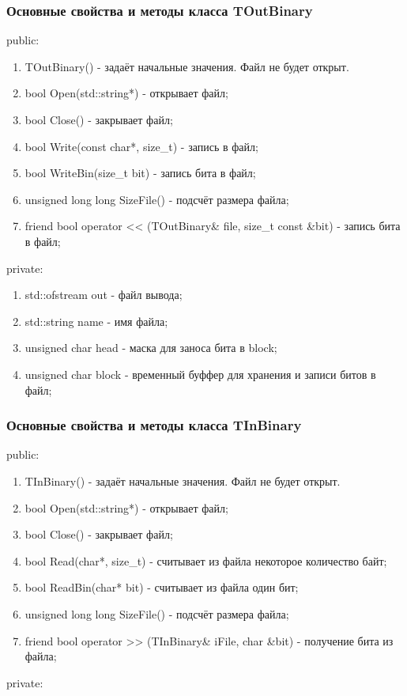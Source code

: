 \documentclass[12pt]{article}
\begin{document}
\subsubsection*{Основные свойства и методы класса TOutBinary}
\noindent
public:

\begin{enumerate}
	\item TOutBinary() - задаёт начальные значения. Файл не будет открыт.
	\item bool Open(std::string*) - открывает файл;
	\item bool Close() - закрывает файл;
	\item bool Write(const char*, size\_t) - запись в файл;
	\item bool WriteBin(size\_t bit) - запись бита в файл;
	\item unsigned long long SizeFile() - подсчёт размера файла;
	\item friend bool operator << (TOutBinary\& file, size\_t const \&bit) - запись бита в файл;
\end{enumerate}
\noindent
private:

\begin{enumerate}
	\item std::ofstream out - файл вывода;
    \item std::string name - имя файла;
    \item unsigned char head - маска для заноса бита в block;
    \item unsigned char block - временный буффер для хранения и записи битов в файл;
\end{enumerate}

\subsubsection*{Основные свойства и методы класса TInBinary}
\noindent
public:

\begin{enumerate}
	\item TInBinary() - задаёт начальные значения. Файл не будет открыт.
	\item bool Open(std::string*) - открывает файл;
	\item bool Close() - закрывает файл;
	\item bool Read(char*, size\_t) - считывает из файла некоторое количество байт;
	\item bool ReadBin(char* bit) - считывает из файла один бит;
	\item unsigned long long SizeFile() - подсчёт размера файла;
	\item friend bool operator >> (TInBinary\& iFile, char \&bit) - получение бита из файла;
\end{enumerate}
\noindent
private:
\end{document}
